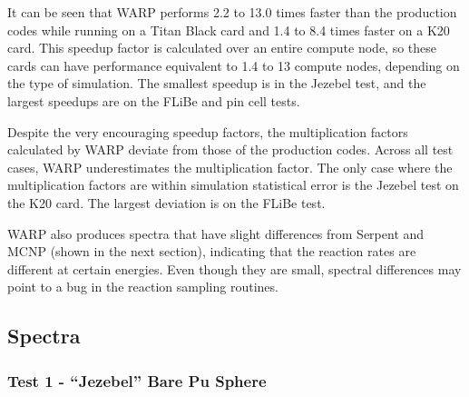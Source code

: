 \documentclass[preprint,12pt]{elsarticle}
\begin{document}
It can be seen that WARP performs 2.2 to 13.0 times faster than the production codes while running on a Titan Black card and 1.4 to 8.4 times faster on a K20 card.  This speedup factor is calculated over an entire compute node, so these cards can have performance equivalent to 1.4 to 13 compute nodes, depending on the type of simulation.   The smallest speedup is in the Jezebel test, and the largest speedups are on the FLiBe and pin cell tests.

Despite the very encouraging speedup factors, the multiplication factors calculated by WARP deviate from those of the production codes.  Across all test cases, WARP underestimates the multiplication factor.  The only case where the multiplication factors are within simulation statistical error is the Jezebel test on the K20 card.  The largest deviation is on the FLiBe test.  

WARP also produces spectra that have slight differences from Serpent and MCNP (shown in the next section), indicating that the reaction rates are different at certain energies.  Even though they are small, spectral differences may point to a bug in the reaction sampling routines.  


\subsection{Spectra}

\subsubsection{Test 1 - ``Jezebel'' Bare Pu Sphere}
\end{document}

